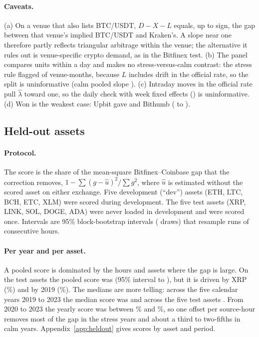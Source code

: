 \documentclass[sigconf,review,anonymous]{acmart}
\begin{document}
\paragraph{Caveats.} (a) On a venue that also lists BTC/USDT, $D-X-L$ equals, up to sign, the gap between that venue's implied
BTC/USDT and Kraken's. A slope near one therefore partly reflects triangular arbitrage within the venue; the alternative it
rules out is venue-specific crypto demand, as in the Bitfinex test. (b) The panel compares units within a day and makes no stress-versus-calm contrast: the stress rule flagged
\NumPNStressUnitMonths{} of \NumPNMonthCount{} venue-months, because $L$ includes drift in the official rate, so the split
is uninformative (calm pooled slope \NumPNPooledCalmLam{}). (c) Intraday moves in the official rate pull $\hat\lambda$ toward one, so the daily check with week fixed effects (\NumPNRobDailyLam{}) is uninformative. (d) Won is
the weakest case: Upbit gave \NumPNUpbitLam{} and Bithumb \NumPNBithumbLam{} (\NumPNBithumbLo{} to \NumPNBithumbHi{}).

\subsection{Held-out assets}
\label{sec:heldout}



\paragraph{Protocol.} The score is the share of the mean-square Bitfinex--Coinbase gap that the correction removes,
$1-\sum(g-\hat u)^2/\sum g^2$, where $\hat u$ is estimated without the scored asset on either exchange. Five development
(``dev'') assets (ETH, LTC, BCH, ETC, XLM) were scored during development. The five test assets (XRP, LINK, SOL, DOGE, ADA)
were never loaded in development and were scored once. Intervals are 95\% block-bootstrap
intervals (\NumPBootDraws{} draws) that resample runs of consecutive hours.

\paragraph{Per year and per asset.} A pooled score is dominated by the hours and assets where the gap is large. On the
test assets the pooled score was \NumPTestPooledEst{} (95\% interval \NumPTestPooledEstLo{} to \NumPTestPooledEstHi{}), but
it is driven by XRP (\NumUTestXrpPct\%) and by 2019 (\NumUTestNineteenPct\%). The medians are more telling: across the five calendar years 2019 to 2023 the median score was \NumRMedTestEstYearMedian{} and across the five test assets \NumRMedTestEstAssetMedian{}. From 2020 to 2023 the yearly score
was between \NumUTestYearMinPct\% and \NumUTestYearMaxPct\%, so one offset per source-hour removes most of the gap in the
stress years and about a third to two-fifths in calm years. Appendix~\ref{app:heldout} gives scores by asset and period.
\end{document}
